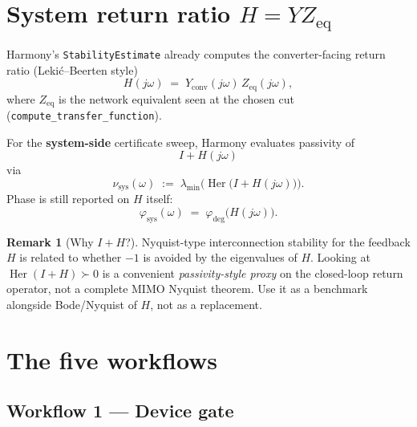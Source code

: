 \documentclass[11pt,a4paper]{article}
\theoremstyle{definition}
\newtheorem{remark}{Remark}
\begin{document}
\section{System return ratio $H=YZ_{\mathrm{eq}}$}

Harmony's \texttt{StabilityEstimate} already computes the converter-facing
return ratio (Leki\'c--Beerten style)
\begin{equation}
  H(j\omega)
  \;=\;
  Y_{\mathrm{conv}}(j\omega)\,Z_{\mathrm{eq}}(j\omega),
\end{equation}
where $Z_{\mathrm{eq}}$ is the network equivalent seen at the chosen cut
(\texttt{compute\_transfer\_function}).

For the \textbf{system-side} certificate sweep, Harmony evaluates passivity of
\begin{equation}
  I+H(j\omega)
\end{equation}
via
\begin{equation}
  \nu_{\mathrm{sys}}(\omega)
  \;:=\;
  \lambda_{\min}\!\bigl(\operatorname{Her}\bigl(I+H(j\omega)\bigr)\bigr).
\end{equation}
Phase is still reported on $H$ itself:
\begin{equation}
  \varphi_{\mathrm{sys}}(\omega)
  \;=\;
  \varphi_{\deg}\bigl(H(j\omega)\bigr).
\end{equation}

\begin{remark}[Why $I+H$?]
Nyquist-type interconnection stability for the feedback $H$ is related to
whether $-1$ is avoided by the eigenvalues of $H$. Looking at
$\operatorname{Her}(I+H)\succ 0$ is a convenient \emph{passivity-style proxy}
on the closed-loop return operator, not a complete MIMO Nyquist theorem.
Use it as a benchmark alongside Bode/Nyquist of $H$, not as a replacement.
\end{remark}

\section{The five workflows}

\subsection{Workflow 1 --- Device gate}
\end{document}
